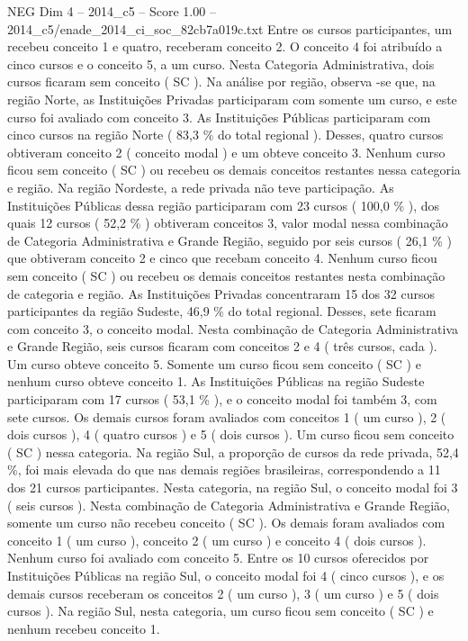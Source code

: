 \begin{textsample}{NEG Dim 4 – 2014\_c5 – Score 1.00 – 2014\_c5/enade\_2014\_ci\_soc\_82cb7a019c.txt}
Entre os cursos participantes, um recebeu conceito 1 e quatro, receberam conceito 2.
O conceito 4 foi atribuído a cinco cursos e o conceito 5, a um curso.
Nesta Categoria Administrativa, dois cursos ficaram sem conceito ( SC ).
Na análise por região, observa -se que, na região Norte, as Instituições Privadas participaram com somente um curso, e este curso foi avaliado com conceito 3.
As Instituições Públicas participaram com cinco cursos na região Norte ( 83,3 \% do total regional ).
Desses, quatro cursos obtiveram conceito 2 ( conceito modal ) e um obteve conceito 3.
Nenhum curso ficou sem conceito ( SC ) ou recebeu os demais conceitos restantes nessa categoria e região.
Na região Nordeste, a rede privada não teve participação.
As Instituições Públicas dessa região participaram com 23 cursos ( 100,0 \% ), dos quais 12 cursos ( 52,2 \% ) obtiveram conceitos 3, valor modal nessa combinação de Categoria Administrativa e Grande Região, seguido por seis cursos ( 26,1 \% ) que obtiveram conceito 2 e cinco que recebam conceito 4.
Nenhum curso ficou sem conceito ( SC ) ou recebeu os demais conceitos restantes nesta combinação de categoria e região.
As Instituições Privadas concentraram 15 dos 32 cursos participantes da região Sudeste, 46,9 \% do total regional.
Desses, sete ficaram com conceito 3, o conceito modal.
Nesta combinação de Categoria Administrativa e Grande Região, seis cursos ficaram com conceitos 2 e 4 ( três cursos, cada ).
Um curso obteve conceito 5.
Somente um curso ficou sem conceito ( SC ) e nenhum curso obteve conceito 1.
As Instituições Públicas na região Sudeste participaram com 17 cursos ( 53,1 \% ), e o conceito modal foi também 3, com sete cursos.
Os demais cursos foram avaliados com conceitos 1 ( um curso ), 2 ( dois cursos ), 4 ( quatro cursos ) e 5 ( dois cursos ).
Um curso ficou sem conceito ( SC ) nessa categoria.
Na região Sul, a proporção de cursos da rede privada, 52,4 \%, foi mais elevada do que nas demais regiões brasileiras, correspondendo a 11 dos 21 cursos participantes.
Nesta categoria, na região Sul, o conceito modal foi 3 ( seis cursos ).
Nesta combinação de Categoria Administrativa e Grande Região, somente um curso não recebeu conceito ( SC ).
Os demais foram avaliados com conceito 1 ( um curso ), conceito 2 ( um curso ) e conceito 4 ( dois cursos ).
Nenhum curso foi avaliado com conceito 5.
Entre os 10 cursos oferecidos por Instituições Públicas na região Sul, o conceito modal foi 4 ( cinco cursos ), e os demais cursos receberam os conceitos 2 ( um curso ), 3 ( um curso ) e 5 ( dois cursos ).
Na região Sul, nesta categoria, um curso ficou sem conceito ( SC ) e nenhum recebeu conceito 1.

\end{textsample}
